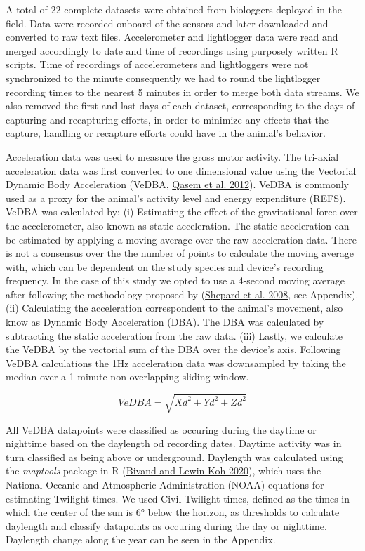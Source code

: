 \documentclass[english,msc,numbers,hidelinks]{coppe}
\begin{document}
  A total of 22 complete datasets were obtained from biologgers deployed in the field. Data were recorded onboard of the sensors and later downloaded and converted to raw text files. Accelerometer and lightlogger data were read and merged accordingly to date and time of recordings using purposely written R scripts. Time of recordings of accelerometers and lightloggers were not synchronized to the minute consequently we had to round the lightlogger recording times to the nearest 5 minutes in order to merge both data streams. We also removed the first and last days of each dataset, corresponding to the days of capturing and recapturing efforts, in order to minimize any effects that the capture, handling or recapture efforts could have in the animal's behavior.

  Acceleration data was used to measure the gross motor activity. The tri-axial acceleration data was first converted to one dimensional value using the Vectorial Dynamic Body Acceleration (VeDBA, \protect\hyperlink{ref-qasem2012}{Qasem et al. 2012}). VeDBA is commonly used as a proxy for the animal's activity level and energy expenditure (REFS). VeDBA was calculated by: (i) Estimating the effect of the gravitational force over the accelerometer, also known as static acceleration. The static acceleration can be estimated by applying a moving average over the raw acceleration data. There is not a consensus over the the number of points to calculate the moving average with, which can be dependent on the study species and device's recording frequency. In the case of this study we opted to use a 4-second moving average after following the methodology proposed by (\protect\hyperlink{ref-shepard2008}{Shepard et al. 2008}, see Appendix). (ii) Calculating the acceleration correspondent to the animal's movement, also know as Dynamic Body Acceleration (DBA). The DBA was calculated by subtracting the static acceleration from the raw data. (iii) Lastly, we calculate the VeDBA by the vectorial sum of the DBA over the device's axis. Following VeDBA calculations the 1Hz acceleration data was downsampled by taking the median over a 1 minute non-overlapping sliding window.

  \[ VeDBA = \sqrt{Xd^2 + Yd^2 + Zd^2} \]

  All VeDBA datapoints were classified as occuring during the daytime or nighttime based on the daylength od recording dates. Daytime activity was in turn classified as being above or underground. Daylength was calculated using the \emph{maptools} package in R (\protect\hyperlink{ref-bivand2020}{Bivand and Lewin-Koh 2020}), which uses the National Oceanic and Atmospheric Administration (NOAA) equations for estimating Twilight times. We used Civil Twilight times, defined as the times in which the center of the sun is 6° below the horizon, as thresholds to calculate daylength and classify datapoints as occuring during the day or nighttime. Daylength change along the year can be seen in the Appendix.
\end{document}
